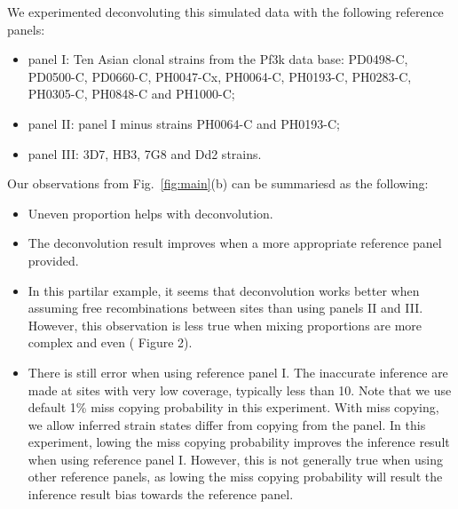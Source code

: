 \documentclass{article}
\begin{document}
We experimented deconvoluting this simulated data with the following reference panels:
\begin{itemize}
\item panel I: Ten Asian clonal strains from the Pf3k \citep{Pf3k2016} data base: {\textmd PD0498-C}, {\textmd PD0500-C}, {\textmd PD0660-C}, {\textmd PH0047-Cx}, {\textmd PH0064-C}, {\textmd PH0193-C}, {\textmd PH0283-C}, {\textmd PH0305-C}, {\textmd PH0848-C} and {\textmd PH1000-C};
\item panel II: panel I minus strains {\textmd PH0064-C} and {\textmd PH0193-C};
\item panel III: 3D7, HB3, 7G8 and Dd2 strains.
\end{itemize}

Our observations from Fig.~\ref{fig:main}(b) can be summariesd as the following:
\begin{itemize}
\item Uneven proportion helps with deconvolution.
\item The deconvolution result improves when a more appropriate reference panel provided.
\item In this partilar example, it seems that deconvolution works better when assuming free recombinations between sites than using panels II and III. However, this observation is less true when mixing proportions are more complex and even (\citet{Zhu2017} Figure 2).
\item There is still error when using reference panel I. The inaccurate inference are made at sites with very low coverage, typically less than 10. Note that we use default 1\% miss copying probability in this experiment. With miss copying, we allow inferred strain states differ from copying from the panel. In this experiment, lowing the miss copying probability improves the inference result when using reference panel I. However, this is not generally true when using other reference panels, as lowing the miss copying probability will result the inference result bias towards the reference panel.
\end{itemize}
\end{document}
